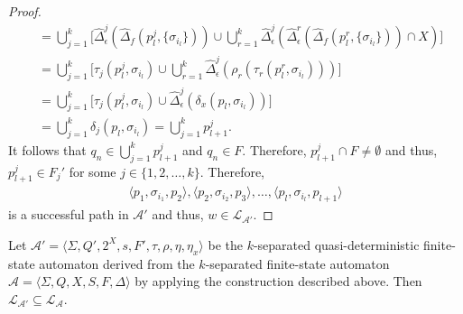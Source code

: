 \begin{proof}
\begin{align*}
    &= \bigcup_{j=1}^k \big[ \hat{\Delta}_\epsilon^j(\hat{\Delta}_f(p_l^j, \{
    \sigma_{i_l} \})) \cup \bigcup_{r=1}^k
    \hat{\Delta}_\epsilon^j(\hat{\Delta}_\epsilon^r(\hat{\Delta}_f
    (p_l^r, \{\sigma_{i_l} \})) \cap X) \big]\\
    &= \bigcup_{j=1}^k \big[ \tau_j(p_l^j, \sigma_{i_l}) \cup \bigcup_{r=1}^k
    \hat{\Delta}_\epsilon^j(\rho_r(\tau_r(p_l^r, \sigma_{i_l})))
    \big]\\
    &= \bigcup_{j=1}^k \big[ \tau_j(p_l^j, \sigma_{i_l}) \cup
    \hat{\Delta}_\epsilon^j(\delta_x(p_l, \sigma_{i_l})) \big]\\
    &= \bigcup_{j=1}^k \delta_j(p_l, \sigma_{i_l})
    = \bigcup_{j=1}^k p_{l+1}^j.
  \end{align*}
  It follows that $q_n \in \bigcup_{j=1}^k{p_{l+1}^j}$ and $q_n \in F$.
  Therefore, $p_{l+1}^j \cap F \neq \emptyset$ and thus, $p_{l+1}^j \in F_j'$ for
  some $j \in \{ 1, 2, \ldots, k \}$. Therefore,
  \begin{align*}
    \langle p_1, \sigma_{i_1}, p_2 \rangle, \langle p_2, \sigma_{i_2}, p_3 \rangle,
    \ldots, \langle p_l, \sigma_{i_l}, p_{l+1} \rangle
  \end{align*}
  is a successful path in $\mathcal{A'}$ and thus, $w \in
  \mathcal{L}_{\mathcal{A}'}$.
\end{proof}

\begin{lemma}\label{lem:quasidet_inclusion_left}
  Let $\mathcal{A}' = \langle \Sigma, Q', 2^X, s, F', \tau, \rho, \eta, \eta_x
  \rangle$ be the $k$-separated quasi-deterministic finite-state automaton derived
  from the $k$-separated finite-state automaton $\mathcal{A} = \langle \Sigma, Q, X,
  S, F, \Delta \rangle$ by applying the construction described above. Then
  $\mathcal{L}_{\mathcal{A}'} \subseteq \mathcal{L}_\mathcal{A}$.
\end{lemma}

